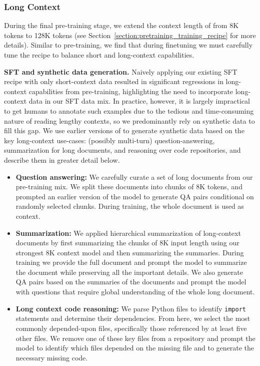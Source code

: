 \subsubsection{Long Context}
\label{subsubsec:long_context}

During the final pre-training stage, we extend the context length of \llamathree from 8K tokens to 128K tokens (see Section~\ref{section:pretraining_training_recipe} for more details). Similar to pre-training, we find that during finetuning we must carefully tune the recipe to balance short and long-context capabilities.

\textbf{SFT and synthetic data generation.} 
Naively applying our existing SFT recipe with only short-context data resulted in significant regressions in long-context capabilities from pre-training, highlighting the need to incorporate long-context data in our SFT data mix. In practice, however, it is largely impractical to get humans to annotate such examples due to the tedious and time-consuming nature of reading lengthy contexts, so we predominantly rely on synthetic data to fill this gap.
We use earlier versions of \llamathree to generate synthetic data based on the key long-context use-cases: (possibly multi-turn) question-answering, summarization for long documents, and reasoning over code repositories, and describe them in greater detail below.

\begin{itemize}
    \item \textbf{Question answering:} We carefully curate a set of long documents from our pre-training mix. We split these documents into chunks of 8K tokens, and prompted an earlier version of the \llamathree model to generate QA pairs conditional on randomly selected chunks. During training, the whole document is used as context.

    \item \textbf{Summarization:} We applied hierarchical summarization of long-context documents by first summarizing the chunks of 8K input length using our strongest \llamathree 8K context model and then summarizing the summaries. During training we provide the full document and prompt the model to summarize the document while preserving all the important details. We also generate QA pairs based on the summaries of the documents and prompt the model with questions that require global understanding of the whole long document.

    \item \textbf{Long context code reasoning:} We parse Python files to identify \texttt{import} statements and determine their dependencies. From here, we select the most commonly depended-upon files, specifically those referenced by at least five other files. We remove one of these key files from a repository and prompt the model to identify which files depended on the missing file and to generate the necessary missing code.
\end{itemize}

